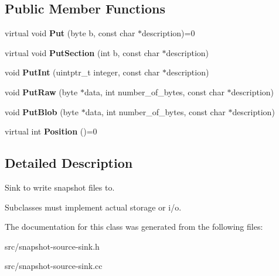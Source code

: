 \subsection*{Public Member Functions}
\begin{DoxyCompactItemize}
\item 
\hypertarget{classv8_1_1internal_1_1_snapshot_byte_sink_a20a2c34a975dba767b8c8ec0575c7c7c}{}virtual void {\bfseries Put} (byte b, const char $\ast$description)=0\label{classv8_1_1internal_1_1_snapshot_byte_sink_a20a2c34a975dba767b8c8ec0575c7c7c}

\item 
\hypertarget{classv8_1_1internal_1_1_snapshot_byte_sink_a3255a77900260d729273244fa033c075}{}virtual void {\bfseries Put\+Section} (int b, const char $\ast$description)\label{classv8_1_1internal_1_1_snapshot_byte_sink_a3255a77900260d729273244fa033c075}

\item 
\hypertarget{classv8_1_1internal_1_1_snapshot_byte_sink_a99f6f87ab81c173335c6525eeec718b8}{}void {\bfseries Put\+Int} (uintptr\+\_\+t integer, const char $\ast$description)\label{classv8_1_1internal_1_1_snapshot_byte_sink_a99f6f87ab81c173335c6525eeec718b8}

\item 
\hypertarget{classv8_1_1internal_1_1_snapshot_byte_sink_a7b2c066182dc736d11ab4d5a82d70fe3}{}void {\bfseries Put\+Raw} (byte $\ast$data, int number\+\_\+of\+\_\+bytes, const char $\ast$description)\label{classv8_1_1internal_1_1_snapshot_byte_sink_a7b2c066182dc736d11ab4d5a82d70fe3}

\item 
\hypertarget{classv8_1_1internal_1_1_snapshot_byte_sink_ad1d3443c68c172c52c63c32ed2b16c00}{}void {\bfseries Put\+Blob} (byte $\ast$data, int number\+\_\+of\+\_\+bytes, const char $\ast$description)\label{classv8_1_1internal_1_1_snapshot_byte_sink_ad1d3443c68c172c52c63c32ed2b16c00}

\item 
\hypertarget{classv8_1_1internal_1_1_snapshot_byte_sink_a4fdb1db728ca138736bdbf69cd6a35e3}{}virtual int {\bfseries Position} ()=0\label{classv8_1_1internal_1_1_snapshot_byte_sink_a4fdb1db728ca138736bdbf69cd6a35e3}

\end{DoxyCompactItemize}


\subsection{Detailed Description}
Sink to write snapshot files to.

Subclasses must implement actual storage or i/o. 

The documentation for this class was generated from the following files\+:\begin{DoxyCompactItemize}
\item 
src/snapshot-\/source-\/sink.\+h\item 
src/snapshot-\/source-\/sink.\+cc\end{DoxyCompactItemize}
